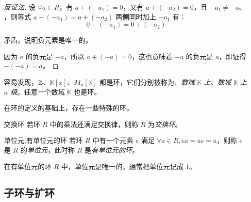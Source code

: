\begin{proof}[反证法]
	设 $\forall a \in R$，有 $a + (-a_1) = 0$，又有 $a + (-a_2) = 0$，且 $-a_1 \ne -a_2$，则等式 $a + (-a_1) = a + (-a_2)$ 两侧同时加上 $-a_1$ 有：
	$$
	0 + (-a_1) = 0 + (-a_2)
	$$

	矛盾，说明负元素是唯一的。

	\bigskip

	因为 $a$ 的负元是 $-a$，所以 $a + (-a) = 0$，这也意味着 $-a$ 的负元是 $a$，即证得 $-(-a) = a$。
\end{proof}

容易发现，$\mathbb Z$、$\mathbb K[x]$、$M_n[\mathbb K]$ 都是环，它们分别被称为\emph{}、\emph{数域 $\mathbb K$ 上}、\emph{数域 $\mathbb K$ 上 $n$ 级}。任意一个数域 $\mathbb K$ 也是环。

\bigskip

在环的定义的基础上，存在一些特殊的环。

\begin{definition}{交换环}
	若环 $R$ 中的乘法还满足交换律，则称 $R$ 为\emph{交换环}。
\end{definition}

\begin{definition}{单位元,有单位元的环}
	若环 $R$ 中有一个元素 $e$ 满足 $\forall a \in R, ea = ae = a$，则称 $e$ 是 $R$ 的\emph{单位元}，此时称 $R$ 是\emph{有单位元的环}。
\end{definition}

\begin{proposition}
	在有单位元的环 $R$ 中，单位元是唯一的，通常把单位元记成 $1$。
\end{proposition}

\subsection{子环与扩环}

